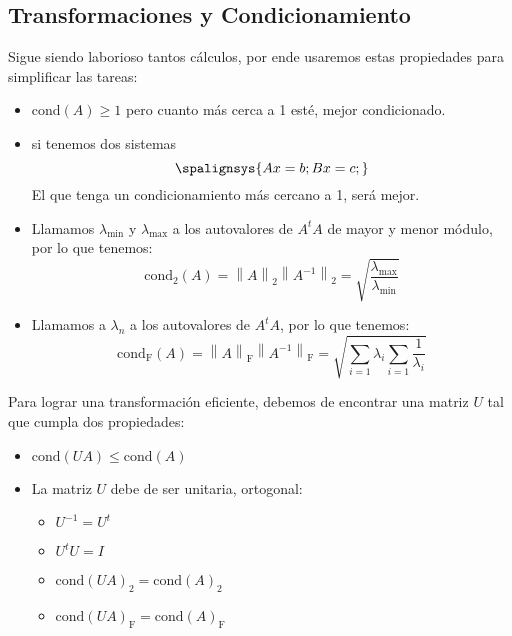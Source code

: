 \subsection{Transformaciones y Condicionamiento}
Sigue siendo laborioso tantos cálculos, por ende usaremos estas propiedades para simplificar las tareas:
\begin{itemize}
        \item \(\text{cond}(A) \geq 1\) pero cuanto más cerca a 1 esté, mejor condicionado.
        \item si tenemos dos sistemas  \[
                      \spalignsys{
                              Ax = b ;
                              Bx = c;
                      }
              \] El que tenga un condicionamiento más cercano a 1, será mejor.
        \item Llamamos \(\lambda_{\text{min}}\) y \(\lambda_{\max }\) a los autovalores de \(A^tA\) de mayor y menor módulo, por lo que tenemos:
              \[
                      \boxed{\text{cond}_2(A) = \left \| A \right \|_2 \left \| A^{-1} \right \|_2=\sqrt{\frac{\lambda_{\max }}{\lambda_{\text{min}}}}}
              \]
        \item Llamamos a \(\lambda_n\) a los autovalores de \(A^tA\), por lo que tenemos:
              \[
                      \boxed{\text{cond}_\text{F}(A) = \left \| A \right \|_\text{F} \left \| A^{-1} \right \|_\text{F}=\sqrt{\sum_{i=1}\lambda_i \sum_{i=1}\frac{1}{\lambda_i}}}
              \]
\end{itemize}
Para lograr una transformación eficiente, debemos de encontrar una matriz \(U\) tal que cumpla dos propiedades:
\begin{itemize}
        \item \(\text{cond}(UA)\leq \text{cond}(A)\)
        \item La matriz \(U\) debe de ser unitaria, ortogonal:
              \begin{itemize}
                      \item \(U^{-1} = U^t\)
                      \item \(U^tU = I\)
                      \item \(\text{cond}(UA)_2 = \text{cond}(A)_2\)
                      \item \(\text{cond}(UA)_\text{F} = \text{cond}(A)_\text{F}\)
              \end{itemize}
\end{itemize}
